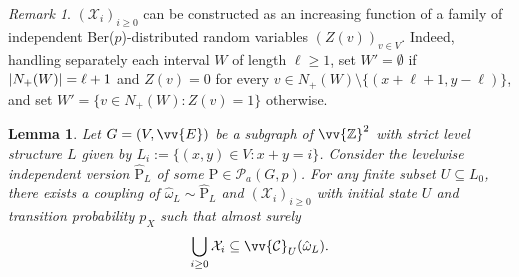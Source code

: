 \documentclass[11pt]{article}
\renewcommand{\P}{\mathrm{P}}
\newcommand{\Z}{\mathbb{Z}}
\DeclarePairedDelimiter{\abs}{\lvert}{\rvert}
\newtheorem{lemma}{Lemma}
\theoremstyle{remark}
\newtheorem{remark}{Remark}
\begin{document}
\begin{remark}\label{rem:markov-chain-increasing-function}
    $(\mathcal X_i)_{i\ge 0}$ can be constructed as an increasing function of a family of independent Ber($p$)-distributed random variables $(Z(v))_{v\in V}$. Indeed, handling separately each interval $W$ of length $\ell \ge 1$, set $W' = \emptyset$ if $\abs{N_+(W)} = \ell + 1$ and $Z(v)=0$ for every $v \in N_+(W) \setminus \{(x+\ell+1,y-\ell)\}$, and set $W' = \{ v \in N_+(W): Z(v)=1\}$ otherwise.
\end{remark}

\begin{lemma}\label{lem:markov-chain-lemma-1}
	Let $G=(V,\vv{E})$ be a subgraph of $\vv{\Z}^2$ with  strict level structure $L$ given by $L_i := \{(x,y) \in V : x+y=i \}$. Consider the levelwise independent version $\hat{\P}_L$ of some $\P \in \mathcal{P}_a(G,p)$. For any finite subset $U \subseteq L_0$, there exists a coupling of  $\hat{\omega}_L \sim \hat{\P}_L$ and $(\mathcal X_i)_{i\ge 0}$ with initial state $U$ and transition probability $p_X$ such that almost surely
	\begin{equation}
		\bigcup_{i\ge 0} \mathcal X_i \subseteq \vv{\mathcal{C}}_U(\hat{\omega}_L) .
	\end{equation}
\end{lemma}
\end{document}
